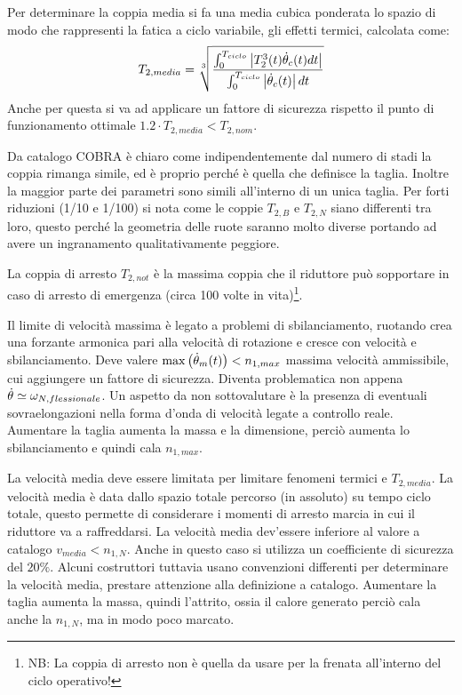 Per determinare la coppia media si fa una media cubica ponderata lo spazio di modo che rappresenti la fatica a ciclo variabile, gli effetti termici, calcolata come:
\[
T_{2,media} = \sqrt[3]{\frac{\int^{T_{ciclo}}_0 \left|T_2^3(t)\dot{\theta}_c(t)dt\right|}{\int^{T_{ciclo}}_0 \left|\dot{\theta}_c(t)\right|dt}}
\]
Anche per questa si va ad applicare un fattore di sicurezza rispetto il punto di funzionamento ottimale $1.2\cdot T_{2,media}<T_{2,nom}$.

Da catalogo COBRA è chiaro come indipendentemente dal numero di stadi la coppia rimanga simile, ed è proprio perché è quella che definisce la taglia. 
Inoltre la maggior parte dei parametri sono simili all'interno di un unica taglia.
Per forti riduzioni (1/10 e 1/100) si nota come le coppie $T_{2,B}$ e $T_{2,N}$ siano differenti tra loro, questo perché la geometria delle ruote saranno molto diverse portando ad avere un ingranamento qualitativamente peggiore.

La coppia di arresto $T_{2,not}$ è la massima coppia che il riduttore può sopportare in caso di arresto di emergenza (circa 100 volte in vita)\footnote{NB: La coppia di arresto non è quella da usare per la frenata all'interno del ciclo operativo!}.

Il limite di velocità massima è legato a problemi di sbilanciamento, ruotando crea una forzante armonica pari alla velocità di rotazione e cresce con velocità e sbilanciamento. 
Deve valere $\operatorname{max}\left(\dot{\theta}_m(t)\right)< n_{1,max}$ massima velocità ammissibile, cui aggiungere un fattore di sicurezza.
Diventa problematica non appena $\dot{\theta} \simeq \omega_{N, flessionale}$.
Un aspetto da non sottovalutare è la presenza di eventuali sovraelongazioni nella forma d'onda di velocità legate a controllo reale.
Aumentare la taglia aumenta la massa e la dimensione, perciò aumenta lo sbilanciamento e quindi cala $n_{1,max}$.

La velocità media deve essere limitata per limitare fenomeni termici e $T_{2,media}$. La velocità media è data dallo spazio totale percorso (in assoluto) su tempo ciclo totale, questo permette di considerare i momenti di arresto marcia in cui il riduttore va a raffreddarsi. La velocità media dev'essere inferiore al valore a catalogo $v_{media} < n_{1,N}$. Anche in questo caso si utilizza un coefficiente di sicurezza del $20\%$. Alcuni costruttori tuttavia usano convenzioni differenti per determinare la velocità media, prestare attenzione alla definizione a catalogo.
Aumentare la taglia aumenta la massa, quindi l'attrito, ossia il calore generato perciò cala anche la $n_{1,N}$, ma in modo poco marcato.

